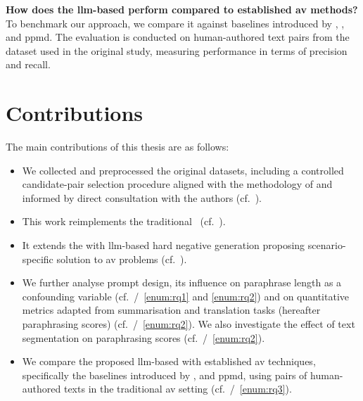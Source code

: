 \begin{questions}
    \item \textbf{How does the \ac{llm}-based \impAppr{} perform compared to established \ac{av} methods?} \label{enum:rq3} \hfill \\
    To benchmark our approach, we compare it against baselines introduced by \citet{koppel_determining_2014}, \unmasking{}, and \acs{ppmd}.
    The evaluation is conducted on human-authored text pairs from the \dataStudent{} dataset used in the original study, measuring performance in terms of precision and recall.
    
\end{questions}

\newpage
\section{Contributions}
\label{sec:contributions}
The main contributions of this thesis are as follows:
\begin{itemize}
    \item We collected and preprocessed the original datasets, including a controlled candidate-pair selection procedure aligned with the methodology of \citet{koppel_determining_2014} and informed by direct consultation with the authors (cf.~).
    \item This work reimplements the traditional \impAppr{} \citep{koppel_determining_2014}\ (cf.~).
    \item It extends the \impAppr{} with \ac{llm}-based hard negative generation proposing scenario-specific solution to \ac{av} problems (cf.~). 
    \item We further analyse prompt design, its influence on paraphrase length as a confounding variable (cf.~/~\ref{enum:rq1} and \ref{enum:rq2}) and on quantitative metrics adapted from summarisation and translation tasks (hereafter paraphrasing scores) (cf.~/~\ref{enum:rq2}).
    We also investigate the effect of text segmentation on paraphrasing scores (cf.~/~\ref{enum:rq2}).
    \item We compare the proposed \ac{llm}-based \impAppr{} with established \ac{av} techniques, specifically the baselines introduced by \citet{koppel_determining_2014}, \unmasking{} and \acs{ppmd}, 
    using pairs of human-authored texts in the traditional \ac{av} setting (cf.~/~\ref{enum:rq3}).
   
\end{itemize}



